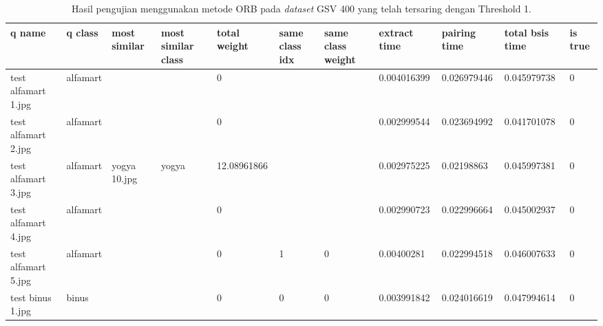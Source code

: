 \begin{landscape}
	\begin{longtable}{|p{2cm}|p{1.5cm}|p{2cm}|p{1.5cm}|p{2cm}|p{1cm}|p{2cm}|p{2cm}|p{2cm}|p{2cm}|p{1cm}|}
		\caption{Hasil pengujian menggunakan metode ORB pada \textit{dataset} GSV 400 yang telah tersaring dengan Threshold 1.} \\
		\hline
		\textbf{q name}      & \textbf{q class} & \textbf{most similar} & \textbf{most similar class} & \textbf{total weight} & \textbf{same class idx} & \textbf{same class weight} & \textbf{extract time} & \textbf{pairing time} & \textbf{total bsis time} & \textbf{is true} \\ \hline
		test alfamart 1.jpg  & alfamart         &                       &                             & 0                     &                         &                            & 0.004016399           & 0.026979446           & 0.045979738              & 0                \\ \hline
		test alfamart 2.jpg  & alfamart         &                       &                             & 0                     &                         &                            & 0.002999544           & 0.023694992           & 0.041701078              & 0                \\ \hline
		test alfamart 3.jpg  & alfamart         & yogya 10.jpg          & yogya                       & 12.08961866           &                         &                            & 0.002975225           & 0.02198863            & 0.045997381              & 0                \\ \hline
		test alfamart 4.jpg  & alfamart         &                       &                             & 0                     &                         &                            & 0.002990723           & 0.022996664           & 0.045002937              & 0                \\ \hline
		test alfamart 5.jpg  & alfamart         &                       &                             & 0                     & 1                       & 0                          & 0.00400281            & 0.022994518           & 0.046007633              & 0                \\ \hline
		test binus 1.jpg     & binus            &                       &                             & 0                     & 0                       & 0                          & 0.003991842           & 0.024016619           & 0.047994614              & 0                \\ \hline

\end{longtable}
\end{landscape}
